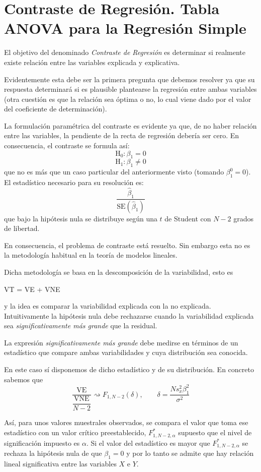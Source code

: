 \documentclass[10pt,a4paper]{book}
\begin{document}
	\section{Contraste de Regresión. Tabla ANOVA para la Regresión Simple}
El objetivo del denominado \textit{Contraste de Regresión} es determinar si realmente existe relación entre las variables explicada y explicativa.

Evidentemente esta debe ser la primera pregunta que debemos resolver ya que su respuesta determinará si es plausible plantearse la regresión entre ambas variables (otra cuestión es que la relación sea óptima o no, lo cual viene dado por el valor del coeficiente de determinación).

La formulación paramétrica del contraste es evidente ya que, de no haber relación entre las variables, la pendiente de la recta de regresión debería ser cero. En consecuencia, el contraste se formula así:
$$\mathrm{H}_0:\beta_1=0$$
$$\mathrm{H}_1:\beta_1\neq 0$$
que no es más que un caso particular del anteriormente visto (tomando $\beta^0_1=0$). El estadístico necesario para su resolución es: $$\dfrac{\widehat{\beta}_1}{\mathrm{SE}(\widehat{\beta}_1)}$$ que bajo la hipótesis nula se distribuye según una $t$ de Student con $N-2$ grados de libertad.

En consecuencia, el problema de contraste está resuelto. Sin embargo esta no es la metodología habitual en la teoría de modelos lineales.

Dicha metodología se basa en la descomposición de la variabilidad, esto es 
\begin{center}
VT = VE + VNE
\end{center}
y la idea es comparar la variabilidad explicada con la no explicada. Intuitivamente la hipótesis nula debe rechazarse cuando la variabilidad explicada sea \textit{significativamente más grande} que la residual.

La expresión \textit{significativamente más grande} debe medirse en términos de un estadístico que compare ambas variabilidades y cuya distribución sea conocida.

En este caso sí disponemos de dicho estadístico y de su distribución. En concreto sabemos que
$$\dfrac{\mathrm{VE}}{\dfrac{\mathrm{VNE}}{N-2}}\rightsquigarrow F_{1,N-2}(\delta),\qquad \delta=\dfrac{Ns^2_x\beta^2_1}{\sigma^2}$$

Así, para unos valores muestrales observados, se compara el valor que toma ese estadístico con un valor crítico preestablecido, $F^*_{1,N-2,\alpha}$ supuesto que el nivel de significación impuesto es $\alpha$. Si el valor del estadístico es mayor que $F^*_{1,N-2,\alpha}$ se rechaza la hipótesis nula de que $\beta_1=0$ y por lo tanto se admite que hay relación lineal significativa entre las variables $X$ e $Y$.
\end{document}
